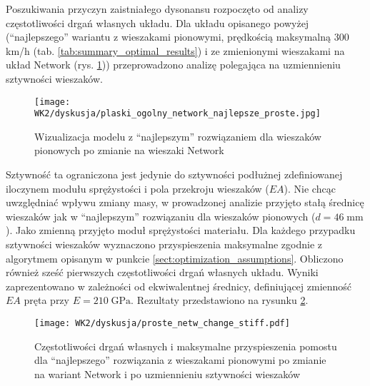 Poszukiwania przyczyn zaistniałego dysonansu rozpoczęto od analizy częstotliwości drgań własnych układu. Dla układu opisanego powyżej (\enquote{najlepszego} wariantu z wieszakami pionowymi, prędkością maksymalną 300 km/h (tab. \ref{tab:summary_optimal_results}) i ze zmienionymi wieszakami na układ Network (rys. \ref{fig:proste_na_network_wiz})) przeprowadzono analizę polegająca na uzmiennieniu sztywności wieszaków.

\begin{figure}[hbt!]
	\centering
	\texttt{[image: WK2/dyskusja/plaski\_ogolny\_network\_najlepsze\_proste.jpg]}
	\captionsetup{justification=centering}
	\caption{Wizualizacja modelu z \enquote{najlepszym} rozwiązaniem dla wieszaków pionowych po zmianie na wieszaki Network}
	\label{fig:proste_na_network_wiz}
\end{figure}
Sztywność ta ograniczona jest jedynie do sztywności podłużnej zdefiniowanej iloczynem modułu sprężystości i pola przekroju wieszaków ($EA$). Nie chcąc uwzględniać wpływu zmiany masy, w prowadzonej analizie przyjęto stałą średnicę wieszaków jak w \enquote{najlepszym} rozwiązaniu dla wieszaków pionowych ($d=46\;\mathrm{mm}$). Jako zmienną przyjęto moduł sprężystości materiału. Dla każdego przypadku sztywności wieszaków wyznaczono przyspieszenia maksymalne zgodnie z algorytmem opisanym w punkcie \ref{sect:optimization_assumptions}. Obliczono również sześć pierwszych częstotliwości drgań własnych układu. Wyniki zaprezentowano w zależności od ekwiwalentnej średnicy, definiującej zmienność $EA$ pręta przy $E=210\; \mathrm{GPa}$. 
Rezultaty przedstawiono na rysunku \ref{fig:proste_na_network_change_hangers_stiff}. 

\begin{figure}[hbt!]
	\centering
	\texttt{[image: WK2/dyskusja/proste\_netw\_change\_stiff.pdf]}
	\captionsetup{justification=centering}
	\caption{Częstotliwości drgań własnych i maksymalne przyspieszenia pomostu dla \enquote{najlepszego} rozwiązania z wieszakami pionowymi po zmianie na wariant Network i po uzmiennieniu sztywności wieszaków}
	\label{fig:proste_na_network_change_hangers_stiff}
\end{figure}

